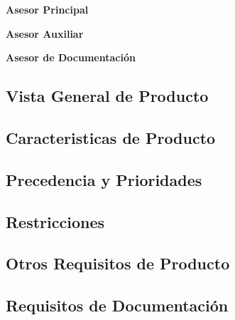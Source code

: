 \textbf{Asesor Principal}

\textbf{Asesor Auxiliar}

\textbf{Asesor de Documentación}

\pagebreak

\subsection{Vista General de Producto}
\subsection{Caracteristicas de Producto}
\subsection{Precedencia y Prioridades}
\subsection{Restricciones}
\subsection{Otros Requisitos de Producto}
\subsection{Requisitos de Documentación}
